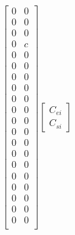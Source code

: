 \documentclass[11pt]{article} %
\begin{document}
\begin{align}
\begin{bmatrix}
        0 & 0\\
        0 & 0\\
        0 & 0\\
        0 & c\\
        0 & 0\\
        0 & 0\\
        0 & 0\\
        0 & 0\\
        0 & 0\\
        0 & 0\\
        0 & 0\\
        0 & 0\\
        0 & 0\\
        0 & 0\\
        0 & 0\\
        0 & 0\\
        0 & 0\\
        0 & 0\\
        0 & 0\\
        0 & 0\\
    \end{bmatrix}
    \begin{bmatrix}
        C_{ei}\\
        C_{si}
    \end{bmatrix}
\end{align}
\end{document}
